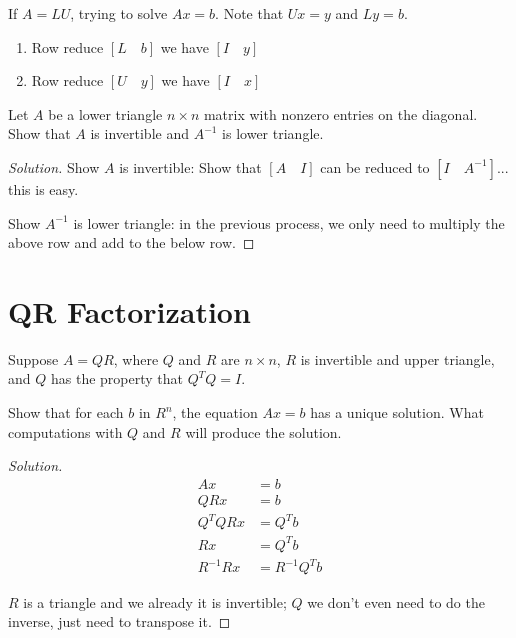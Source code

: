 \begin{note}
    If \(A = LU\), trying to solve \(Ax = b\). 
    Note that \(Ux = y\) and \(Ly = b\).

    \begin{enumerate}
        \item Row reduce \([L \quad b]\) we have \([I \quad y]\)  
        \item Row reduce \([U \quad y]\) we have \([I \quad x]\)  
    \end{enumerate}
\end{note}

\begin{problem}
    Let \(A\) be a lower triangle \(n \times n\) matrix with nonzero entries on the diagonal. 
    Show that \(A\) is invertible and \(A^{-1}\) is lower triangle.  
\end{problem}
\begin{proof}[Solution]
    Show \(A\) is invertible:  
    Show that \([A \quad I]\) can be reduced to \([I \quad A^{-1}]\)... this is easy.

    Show \(A^{-1}\) is lower triangle: in the previous process, we only need to multiply the above row and add to the below row.
\end{proof}


\section{QR Factorization}
\begin{problem}
    Suppose \(A = QR\), where \(Q\) and \(R\) are \(n \times n\), 
    \(R\) is invertible and upper triangle, 
    and \(Q\) has the property that \(Q^TQ = I\).   

    Show that for each \(b\) in \(R^n\), the equation \(Ax = b\) has a unique solution.   
    What computations with \(Q\) and \(R\) will produce the solution.  
\end{problem}
\begin{proof}[Solution]
    \begin{align*}
        Ax &= b \\
        QR x &= b \\
        Q^T Q R x &= Q^T b \\
        R x &= Q^T b \\
        R^{-1} R x &= R^{-1} Q^T b
    \end{align*}

    \(R\) is a triangle and we already it is invertible; \(Q\) we don't even need to do the inverse, just need to transpose it.  
\end{proof}


